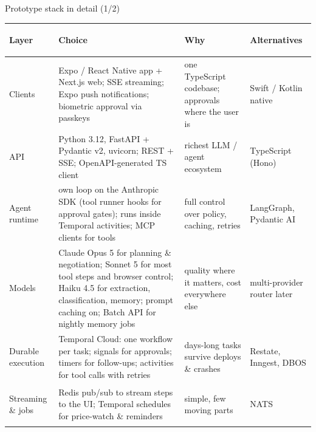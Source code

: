 \documentclass[aspectratio=169,10pt]{beamer}
\begin{document}
\begin{frame}{Prototype stack in detail (1/2)}
\scriptsize
\renewcommand{\arraystretch}{1.3}
\begin{tabularx}{\linewidth}{>{\bfseries\raggedright\arraybackslash}p{2.0cm} X p{2.9cm} p{2.2cm}}
\toprule
Layer & Choice & Why & Alternatives\\
\midrule
Clients & Expo / React Native app + Next.js web; SSE streaming; Expo push notifications; biometric approval via passkeys & one TypeScript codebase; approvals where the user is & Swift / Kotlin native\\
API & Python 3.12, FastAPI + Pydantic v2, uvicorn; REST + SSE; OpenAPI-generated TS client & richest LLM / agent ecosystem & TypeScript (Hono)\\
Agent runtime & own loop on the Anthropic SDK (tool runner hooks for approval gates); runs inside Temporal activities; MCP clients for tools & full control over policy, caching, retries & LangGraph, Pydantic AI\\
Models & Claude Opus 5 for planning \& negotiation; Sonnet 5 for most tool steps and browser control; Haiku 4.5 for extraction, classification, memory; prompt caching on; Batch API for nightly memory jobs & quality where it matters, cost everywhere else & multi-provider router later\\
Durable execution & Temporal Cloud: one workflow per task; signals for approvals; timers for follow-ups; activities for tool calls with retries & days-long tasks survive deploys \& crashes & Restate, Inngest, DBOS\\
Streaming \& jobs & Redis pub/sub to stream steps to the UI; Temporal schedules for price-watch \& reminders & simple, few moving parts & NATS\\
\bottomrule
\end{tabularx}
\end{frame}
\end{document}
